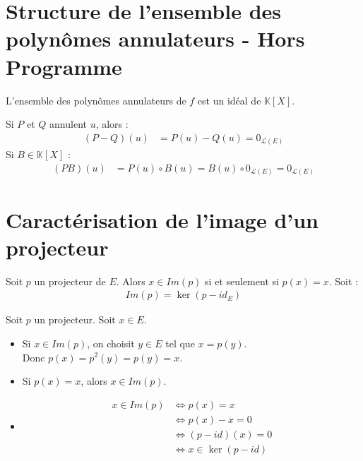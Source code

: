 \documentclass[../main.tex]{subfiles}
\begin{document}
\section{Structure de l'ensemble des polynômes annulateurs - Hors Programme}
\begin{tcolorbox}[title=Propostion 21.41 - HP, title filled=false, colframe=lightblue, colback=lightblue!10!white]
    L'ensemble des polynômes annulateurs de $f$ est un idéal de $\mathbb{K}[X]$.
\end{tcolorbox}

\noindent Si $P$ et $Q$ annulent $u$, alors : 
\begin{align*}
    (P-Q)(u) &= P(u) - Q(u) = 0_{\mathcal{L}(E)}
\end{align*}
Si $B \in \mathbb{K}[X]$ : 
\begin{align*}
    (PB)(u) &= P(u) \circ B(u) = B(u) \circ 0_{\mathcal{L}(E)} = 0_{\mathcal{L}(E)}
\end{align*}

\section{Caractérisation de l'image d'un projecteur}
\begin{tcolorbox}[title=Propostion 21.52, title filled=false, colframe=lightblue, colback=lightblue!10!white]
    Soit $p$ un projecteur de $E$. Alors $x\in Im(p)$ si et seulement si $p(x) = x$. Soit : 
    \begin{align*}
        Im(p) = \ker(p - id_E)
    \end{align*}
\end{tcolorbox}

\noindent Soit $p$ un projecteur. Soit $x\in E$. 
\begin{itemize}
    \item Si $x\in Im(p)$, on choisit $y\in E$ tel que $x = p(y)$. \\
    Donc $p(x) = p^2(y) = p(y) = x$.
    \item Si $p(x) = x$, alors $x\in Im(p)$. 
    \item \begin{align*}
        x\in Im(p) &\Leftrightarrow p(x) = x \\
        &\Leftrightarrow p(x) - x = 0 \\
        &\Leftrightarrow (p - id)(x) = 0 \\
        &\Leftrightarrow x\in \ker(p - id)
    \end{align*}
\end{itemize}
\end{document}
